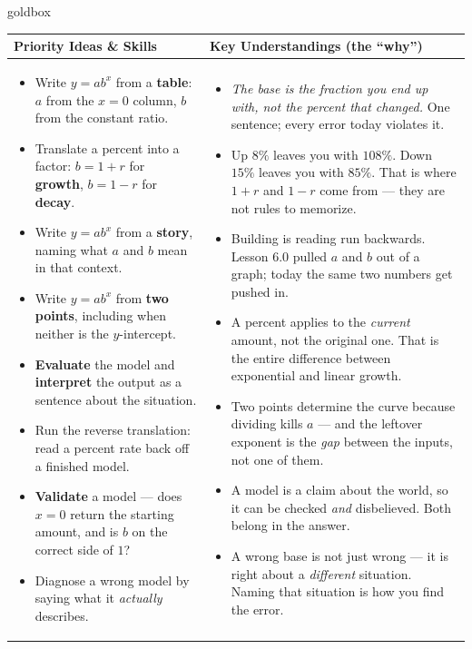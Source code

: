 \documentclass[10pt]{article}
\begin{document}
\renewcommand{\arraystretch}{1.4}
\begin{skillbox}{goldbox}
\begin{tabularx}{\linewidth}{@{}X|X@{}}
\textbf{Priority Ideas \& Skills} & \textbf{Key Understandings (the ``why'')} \\[2pt]
\hline
\vspace{-6pt}
\begin{itemize}[leftmargin=1.1em, nosep, after=\vspace{2pt}]
  \item Write $y=ab^{x}$ from a \textbf{table}: $a$ from the $x=0$ column, $b$ from the constant ratio.
  \item Translate a percent into a factor: $b=1+r$ for \textbf{growth}, $b=1-r$ for \textbf{decay}.
  \item Write $y=ab^{x}$ from a \textbf{story}, naming what $a$ and $b$ mean in that context.
  \item Write $y=ab^{x}$ from \textbf{two points}, including when neither is the $y$-intercept.
  \item \textbf{Evaluate} the model and \textbf{interpret} the output as a sentence about the situation.
  \item Run the reverse translation: read a percent rate back off a finished model.
  \item \textbf{Validate} a model --- does $x=0$ return the starting amount, and is $b$ on the correct side of $1$?
  \item Diagnose a wrong model by saying what it \emph{actually} describes.
\end{itemize}
&
\vspace{-6pt}
\begin{itemize}[leftmargin=1.1em, nosep, after=\vspace{2pt}]
  \item \emph{The base is the fraction you end up with, not the percent that changed.} One sentence; every error today violates it.
  \item Up $8\%$ leaves you with $108\%$. Down $15\%$ leaves you with $85\%$. That is where $1+r$ and $1-r$ come from --- they are not rules to memorize.
  \item Building is reading run backwards. Lesson 6.0 pulled $a$ and $b$ out of a graph; today the same two numbers get pushed in.
  \item A percent applies to the \emph{current} amount, not the original one. That is the entire difference between exponential and linear growth.
  \item Two points determine the curve because dividing kills $a$ --- and the leftover exponent is the \emph{gap} between the inputs, not one of them.
  \item A model is a claim about the world, so it can be checked \emph{and} disbelieved. Both belong in the answer.
  \item A wrong base is not just wrong --- it is right about a \emph{different} situation. Naming that situation is how you find the error.
\end{itemize}
\end{tabularx}
\end{skillbox}
\end{document}

